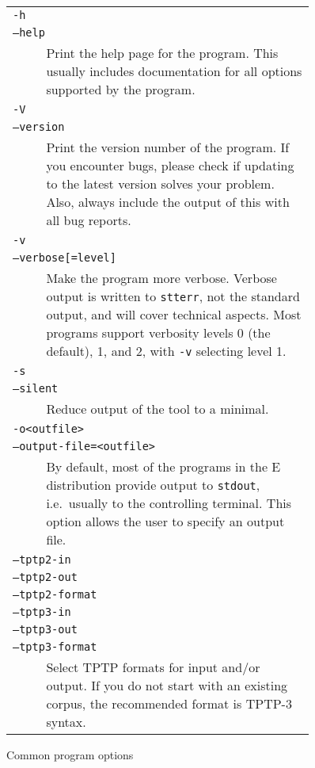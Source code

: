\documentclass{report}
\begin{document}
\begin{figure}
  \small
  \centering
  \begin{tabular}{p{0.1\linewidth}p{0.8\linewidth}}
    \multicolumn{2}{l}{\texttt{-h}}\\
    \multicolumn{2}{l}{\texttt{--help}}\\
    & Print the help page for the program. This usually includes documentation for
    all options supported by the program.\\
    \multicolumn{2}{l}{\texttt{-V}}\\
    \multicolumn{2}{l}{\texttt{--version}}\\
    & Print the version number of the program. If you encounter bugs,
    please check if updating to the latest version solves your
    problem. Also, always include the output of this with all bug
    reports.\\
    \multicolumn{2}{l}{\texttt{-v}}\\
    \multicolumn{2}{l}{\texttt{--verbose[=level]}}\\
    & Make the program more verbose. Verbose output is written to
    \texttt{stterr}, not the standard output, and will cover technical
    aspects. Most programs support verbosity levels 0 (the default),
    1, and 2, with \texttt{-v} selecting level 1.\\
    \multicolumn{2}{l}{\texttt{-s}}\\
    \multicolumn{2}{l}{\texttt{--silent}}\\
    & Reduce output of the tool to a minimal. \\
    \multicolumn{2}{l}{\texttt{-o<outfile>}}\\
    \multicolumn{2}{l}{\texttt{--output-file=<outfile>}}\\
    & By default, most of the programs in the E distribution provide
    output to \texttt{stdout}, i.e.\ usually to the controlling
    terminal. This option allows the user to specify an output
    file. \\
    \multicolumn{2}{l}{\texttt{--tptp2-in    }}\\
    \multicolumn{2}{l}{\texttt{--tptp2-out   }}\\
    \multicolumn{2}{l}{\texttt{--tptp2-format}}\\
    \multicolumn{2}{l}{\texttt{--tptp3-in    }}\\
    \multicolumn{2}{l}{\texttt{--tptp3-out   }}\\
    \multicolumn{2}{l}{\texttt{--tptp3-format}}\\
    & Select TPTP formats for input and/or output. If you do not start
    with an existing corpus, the recommended format is TPTP-3 syntax.\\
  \end{tabular}
  \caption{Common program options}
  \label{tab:opts}
\end{figure}
\end{document}
